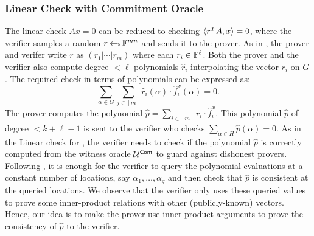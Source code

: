 \subsubsection{Linear Check with Commitment Oracle}\label{sec:lincheck2D}
The linear check $Ax=0$ can be reduced to checking
$\langle r^TA,x\rangle=0$, where the verifier samples a random $r\hskip2.3pt{\gets\!\!\mbox{\tiny${\$}$\normalsize}}\, \mathbb{F}^{mn}$
and sends it to the prover. As in \cite{ligero}, the prover and verifer write $r$ as
$(r_{1}|\cdots|r_{m})$ where each $r_i\in \mathbb{F}^\ell$. Both the prover and the
verifier also compute degree $<\ell$ polynomials $\hat{r}_{i}$ interpolating
the vector $r_{i}$ on $G$. The required check in terms of polynomials can be
expressed as:
\begin{equation}\label{eq:lincheck2D}
\sum_{\alpha\in G}\sum_{j\in [m]}
\hat{r}_{i}(\alpha) \cdot \hat{f}^x_{i}(\alpha) = 0.
\end{equation}
The prover computes the polynomial $\hat{p}=\sum_{i\in[m]}\hat{r}_i \cdot \hat{f}^x_i$. 
This polynomial $\hat{p}$ of degree $< k+\ell-1$ is sent to the verifier who checks
$\sum_{\alpha\in H}\hat{p}(\alpha)=0$. 
As in the Linear check for \cite{ligero}, the verifier needs to check if
the polynomial $\hat{p}$ is correctly computed from the witness oracle $\mathcal{U}^{\mathsf{Com}}$
to guard against dishonest provers.
Following \cite{ligero}, it is enough for the verifier to query the polynomial evaluations at a constant
number of locations, say $\alpha_1,\ldots,\alpha_q$ and then check
that $\hat{p}$ is consistent at the queried locations. We observe that the verifier only
uses these queried values to prove some inner-product relations with other 
(publicly-known) vectors. Hence, our idea is to make the prover 
use inner-product arguments to prove the consistency of $\hat{p}$ to the verifier.

